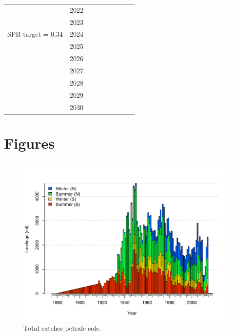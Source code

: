 \documentclass[12pt,]{article}
\begin{document}
\begin{table}[ht]
{\begin{tabular}{l|cc|>{\centering}p{.7in}c|>{\centering}p{.7in}c|>{\centering}p{.7in}c}
   & 2022 &  &  &  &  &  &  &  \\ 
   & 2023 &  &  &  &  &  &  &  \\ 
  SPR target = 0.34 & 2024 &  &  &  &  &  &  &  \\ 
   & 2025 &  &  &  &  &  &  &  \\ 
   & 2026 &  &  &  &  &  &  &  \\ 
   & 2027 &  &  &  &  &  &  &  \\ 
   & 2028 &  &  &  &  &  &  &  \\ 
   & 2029 &  &  &  &  &  &  &  \\ 
   & 2030 &  &  &  &  &  &  &  \\ 
   \hline
\end{tabular}
}
\end{table}

\clearpage

\section{Figures}\label{figures}

\FloatBarrier

\begin{figure}
\centering
\includegraphics{r4ss/plots_mod1/catch2 landings stacked.png}
\caption{Total catches petrale sole. \label{fig:Catch}}
\end{figure}

\FloatBarrier
\end{document}
